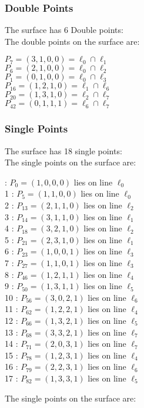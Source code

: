 \documentclass{article}
\begin{document}
{\subsubsection*{Double Points}
The surface has 6 Double points:\\
The double points on the surface are:\\
\begin{multicols}{2}
\noindent
$P_{7} = ( 3, 1, 0, 0 ) = \ell_{0} \cap \ell_{1} $\\
$P_{6} = ( 2, 1, 0, 0 ) = \ell_{0} \cap \ell_{2} $\\
$P_{1} = ( 0, 1, 0, 0 ) = \ell_{0} \cap \ell_{3} $\\
$P_{16} = ( 1, 2, 1, 0 ) = \ell_{1} \cap \ell_{6} $\\
$P_{20} = ( 1, 3, 1, 0 ) = \ell_{2} \cap \ell_{7} $\\
$P_{42} = ( 0, 1, 1, 1 ) = \ell_{6} \cap \ell_{7} $\\
\end{multicols}
\subsubsection*{Single Points}
The surface has 18 single points:\\
The single points on the surface are:\\
\begin{multicols}{2}
 : $P_{0}=( 1, 0, 0, 0 )$ lies on line $\ell_{0}$\\
1 : $P_{5}=( 1, 1, 0, 0 )$ lies on line $\ell_{0}$\\
2 : $P_{13}=( 2, 1, 1, 0 )$ lies on line $\ell_{2}$\\
3 : $P_{14}=( 3, 1, 1, 0 )$ lies on line $\ell_{1}$\\
4 : $P_{18}=( 3, 2, 1, 0 )$ lies on line $\ell_{2}$\\
5 : $P_{21}=( 2, 3, 1, 0 )$ lies on line $\ell_{1}$\\
6 : $P_{23}=( 1, 0, 0, 1 )$ lies on line $\ell_{3}$\\
7 : $P_{27}=( 1, 1, 0, 1 )$ lies on line $\ell_{3}$\\
8 : $P_{46}=( 1, 2, 1, 1 )$ lies on line $\ell_{4}$\\
9 : $P_{50}=( 1, 3, 1, 1 )$ lies on line $\ell_{5}$\\
10 : $P_{56}=( 3, 0, 2, 1 )$ lies on line $\ell_{6}$\\
11 : $P_{62}=( 1, 2, 2, 1 )$ lies on line $\ell_{4}$\\
12 : $P_{66}=( 1, 3, 2, 1 )$ lies on line $\ell_{5}$\\
13 : $P_{68}=( 3, 3, 2, 1 )$ lies on line $\ell_{7}$\\
14 : $P_{71}=( 2, 0, 3, 1 )$ lies on line $\ell_{7}$\\
15 : $P_{78}=( 1, 2, 3, 1 )$ lies on line $\ell_{4}$\\
16 : $P_{79}=( 2, 2, 3, 1 )$ lies on line $\ell_{6}$\\
17 : $P_{82}=( 1, 3, 3, 1 )$ lies on line $\ell_{5}$\\
\end{multicols}
The single points on the surface are:\\
}
\end{document}
